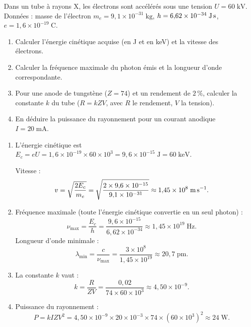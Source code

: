 \documentclass[12pt,a4paper]{article}
\begin{document}
\begin{boiteexercice}
\niveau{\moyen}
Dans un tube à rayons X, les électrons sont accélérés sous une tension $U = 60\;\text{kV}$. Données : masse de l'électron $m_e = 9{,}1\times10^{-31}\;\text{kg}$, $h = 6{,}62\times10^{-34}\;\text{J\,s}$, $e = 1{,}6\times10^{-19}\;\text{C}$.
\begin{enumerate}
  \item Calculer l'énergie cinétique acquise (en J et en keV) et la vitesse des électrons.
  \item Calculer la fréquence maximale du photon émis et la longueur d'onde correspondante.
  \item Pour une anode de tungstène ($Z=74$) et un rendement de $2\,\%$, calculer la constante $k$ du tube ($R = kZV$, avec $R$ le rendement, $V$ la tension).
  \item En déduire la puissance du rayonnement pour un courant anodique $I = 20\;\text{mA}$.
\end{enumerate}
\end{boiteexercice}

\begin{boitecorrige}
\begin{enumerate}
\item L'énergie cinétique est $E_c = eU = 1{,}6\times10^{-19}\times60\times10^3 = 9{,}6\times10^{-15}\;\text{J} = 60\;\text{keV}$.

Vitesse :
\[
v = \sqrt{\frac{2E_c}{m_e}} = \sqrt{\frac{2\times9{,}6\times10^{-15}}{9{,}1\times10^{-31}}} \approx 1{,}45\times10^8\;\text{m\,s}^{-1}.
\]

\item Fréquence maximale (toute l'énergie cinétique convertie en un seul photon) :
\[
\nu_\text{max} = \frac{E_c}{h} = \frac{9{,}6\times10^{-15}}{6{,}62\times10^{-34}} \approx 1{,}45\times10^{19}\;\text{Hz}.
\]
Longueur d'onde minimale :
\[
\lambda_\text{min} = \frac{c}{\nu_\text{max}} = \frac{3\times10^8}{1{,}45\times10^{19}} \approx 20{,}7\;\text{pm.}
\]

\item La constante $k$ vaut :
\[
k = \frac{R}{ZV} = \frac{0{,}02}{74\times60\times10^3} \approx 4{,}50\times10^{-9}.
\]

\item Puissance du rayonnement :
\[
P = kIZV^2 = 4{,}50\times10^{-9}\times20\times10^{-3}\times74\times(60\times10^3)^2 \approx 24\;\text{W.}
\]
\end{enumerate}
\end{boitecorrige}
\end{document}
